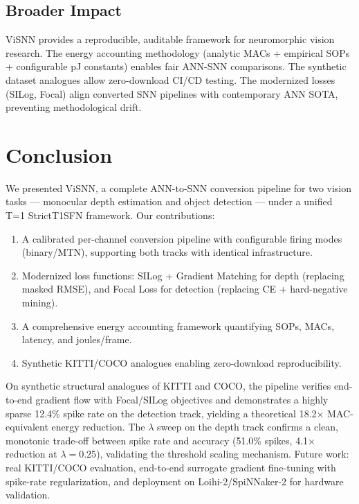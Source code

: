 \documentclass[10pt,conference]{IEEEtran}
\begin{document}
\subsection{Broader Impact}

ViSNN provides a reproducible, auditable framework for neuromorphic vision research. The energy accounting methodology (analytic MACs + empirical SOPs + configurable pJ constants) enables fair ANN-SNN comparisons. The synthetic dataset analogues allow zero-download CI/CD testing. The modernized losses (SILog, Focal) align converted SNN pipelines with contemporary ANN SOTA, preventing methodological drift.

\section{Conclusion}
\label{sec:conclusion}

We presented ViSNN, a complete ANN-to-SNN conversion pipeline for two vision tasks — monocular depth estimation and object detection — under a unified T=1 StrictT1SFN framework. Our contributions:

\begin{enumerate}
    \item A calibrated per-channel conversion pipeline with configurable firing modes (binary/MTN), supporting both tracks with identical infrastructure.
    \item Modernized loss functions: SILog + Gradient Matching for depth (replacing masked RMSE), and Focal Loss for detection (replacing CE + hard-negative mining).
    \item A comprehensive energy accounting framework quantifying SOPs, MACs, latency, and joules/frame.
    \item Synthetic KITTI/COCO analogues enabling zero-download reproducibility.
\end{enumerate}

On synthetic structural analogues of KITTI and COCO, the pipeline verifies end-to-end gradient flow with Focal/SILog objectives and demonstrates a highly sparse 12.4\% spike rate on the detection track, yielding a theoretical 18.2$\times$ MAC-equivalent energy reduction. The $\lambda$ sweep on the depth track confirms a clean, monotonic trade-off between spike rate and accuracy (51.0\% spikes, 4.1$\times$ reduction at $\lambda=0.25$), validating the threshold scaling mechanism. Future work: real KITTI/COCO evaluation, end-to-end surrogate gradient fine-tuning with spike-rate regularization, and deployment on Loihi-2/SpiNNaker-2 for hardware validation.



\end{document}
